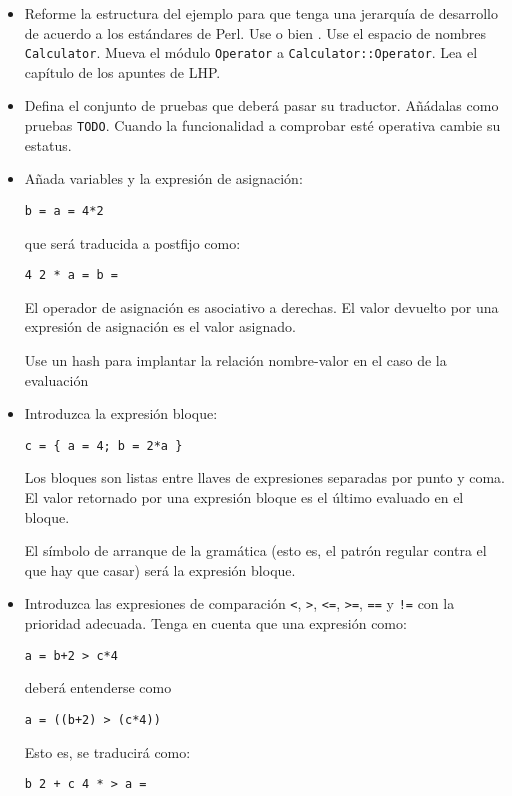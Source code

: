 
\begin{itemize}
\item Reforme la estructura del ejemplo para que tenga una jerarquía
de desarrollo de acuerdo a los estándares de Perl. Use  
o bien . Use el espacio de nombres \verb|Calculator|.
Mueva el módulo \verb|Operator| a \verb|Calculator::Operator|.
Lea el capítulo  de los apuntes de LHP.

\item Defina el conjunto de pruebas que deberá pasar su traductor.
Añádalas como pruebas \verb|TODO|. Cuando la funcionalidad 
a comprobar esté operativa cambie su estatus.

\item Añada variables y la expresión de asignación:

\begin{verbatim}
b = a = 4*2
\end{verbatim}
que será traducida a postfijo como:

\begin{verbatim}
4 2 * a = b =
\end{verbatim}
El operador de asignación es asociativo a derechas.
El valor devuelto por una expresión de asignación es el valor asignado.

Use un hash para implantar la relación nombre-valor
en el caso de la evaluación

\item Introduzca la expresión bloque:

\begin{verbatim}
c = { a = 4; b = 2*a }
\end{verbatim}

Los bloques son listas entre llaves de expresiones separadas por punto y coma.
El valor retornado por una expresión bloque es el último evaluado 
en el bloque.

El símbolo de arranque de la gramática (esto es, el patrón regular
contra el que hay que casar) será la expresión bloque.

\item Introduzca las expresiones de comparación \verb|<|, \verb|>|, \verb|<=|, \verb|>=|, \verb|==| y \verb|!=|
con la prioridad adecuada. Tenga en cuenta que una expresión como:
\begin{verbatim}
a = b+2 > c*4
\end{verbatim}
deberá entenderse como
\begin{verbatim}
a = ((b+2) > (c*4))
\end{verbatim}
Esto es, se traducirá como:
\begin{verbatim}
b 2 + c 4 * > a =
\end{verbatim}


\end{itemize}
